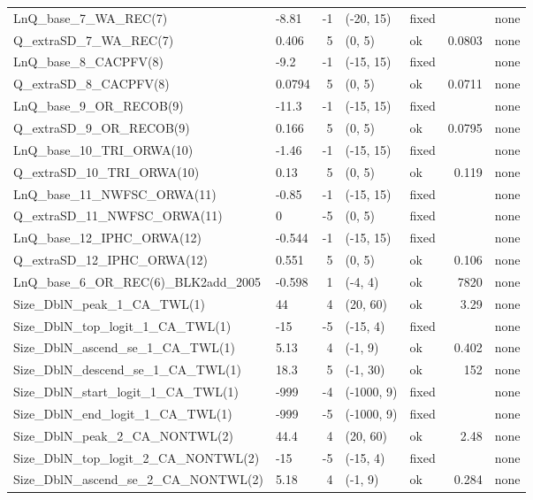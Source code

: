 \documentclass[
]{scrartcl}
\begin{document}
\begin{longtable}{llrllrl}
LnQ\_base\_7\_WA\_REC(7) & -8.81 & -1 & (-20, 15) & fixed &  & none \\ 
Q\_extraSD\_7\_WA\_REC(7) & 0.406 & 5 & (0, 5) & ok & 0.0803 & none \\ 
LnQ\_base\_8\_CACPFV(8) & -9.2 & -1 & (-15, 15) & fixed &  & none \\ 
Q\_extraSD\_8\_CACPFV(8) & 0.0794 & 5 & (0, 5) & ok & 0.0711 & none \\ 
LnQ\_base\_9\_OR\_RECOB(9) & -11.3 & -1 & (-15, 15) & fixed &  & none \\ 
Q\_extraSD\_9\_OR\_RECOB(9) & 0.166 & 5 & (0, 5) & ok & 0.0795 & none \\ 
LnQ\_base\_10\_TRI\_ORWA(10) & -1.46 & -1 & (-15, 15) & fixed &  & none \\ 
Q\_extraSD\_10\_TRI\_ORWA(10) & 0.13 & 5 & (0, 5) & ok & 0.119 & none \\ 
LnQ\_base\_11\_NWFSC\_ORWA(11) & -0.85 & -1 & (-15, 15) & fixed &  & none \\ 
Q\_extraSD\_11\_NWFSC\_ORWA(11) & 0 & -5 & (0, 5) & fixed &  & none \\ 
LnQ\_base\_12\_IPHC\_ORWA(12) & -0.544 & -1 & (-15, 15) & fixed &  & none \\ 
Q\_extraSD\_12\_IPHC\_ORWA(12) & 0.551 & 5 & (0, 5) & ok & 0.106 & none \\ 
LnQ\_base\_6\_OR\_REC(6)\_BLK2add\_2005 & -0.598 & 1 & (-4, 4) & ok & 7820 & none \\ 
Size\_DblN\_peak\_1\_CA\_TWL(1) & 44 & 4 & (20, 60) & ok & 3.29 & none \\ 
Size\_DblN\_top\_logit\_1\_CA\_TWL(1) & -15 & -5 & (-15, 4) & fixed &  & none \\ 
Size\_DblN\_ascend\_se\_1\_CA\_TWL(1) & 5.13 & 4 & (-1, 9) & ok & 0.402 & none \\ 
Size\_DblN\_descend\_se\_1\_CA\_TWL(1) & 18.3 & 5 & (-1, 30) & ok & 152 & none \\ 
Size\_DblN\_start\_logit\_1\_CA\_TWL(1) & -999 & -4 & (-1000, 9) & fixed &  & none \\ 
Size\_DblN\_end\_logit\_1\_CA\_TWL(1) & -999 & -5 & (-1000, 9) & fixed &  & none \\ 
Size\_DblN\_peak\_2\_CA\_NONTWL(2) & 44.4 & 4 & (20, 60) & ok & 2.48 & none \\ 
Size\_DblN\_top\_logit\_2\_CA\_NONTWL(2) & -15 & -5 & (-15, 4) & fixed &  & none \\ 
Size\_DblN\_ascend\_se\_2\_CA\_NONTWL(2) & 5.18 & 4 & (-1, 9) & ok & 0.284 & none \\ 

\end{longtable}
\end{document}
